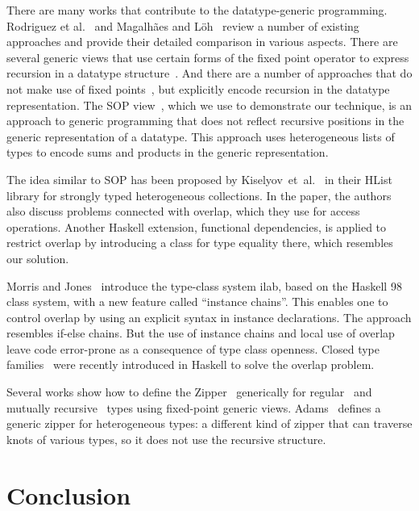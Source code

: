 \documentclass[sigplan,screen,review,anonymous]{acmart}
\begin{document}
There are many works that contribute to the datatype-generic programming. Rodriguez et al.~\cite{Rodriguez2008} and Magalh{\~{a}}es and L{\"{o}}h~\cite{MagLoeh2012} review a number of existing approaches and provide their detailed comparison in various aspects. There are several generic views that use certain forms of the fixed point operator to express recursion in a datatype structure~\cite{VanNoort2008,MuRec2009,Jansson1997,Loeh2011}. And there are a number of approaches that do not make use of fixed points~\cite{Chakravarty2009,Magalhaes2010}, but explicitly encode recursion in the datatype representation. The SOP view~\cite{VriLoeh2014}, which we use to demonstrate our technique, is an approach to generic programming that does not reflect recursive positions in the generic representation of a datatype. This approach uses heterogeneous lists of types to encode sums and products in the generic representation.

The idea similar to SOP has been proposed by Kiselyov~et~al.~\cite{Kiselyov2004} in their \textsf{HList} library for strongly typed heterogeneous collections. In the paper, the authors also discuss problems connected with overlap, which they use for access operations. Another Haskell extension, functional dependencies, is applied to restrict overlap by introducing a class for type equality there, which resembles our solution.

Morris and Jones~\cite{Morris2010} introduce the type-class system \textsf{ilab}, based on the Haskell 98 class system, with a new feature called ``instance chains''. This enables one to control overlap by using an explicit syntax in instance declarations. The approach resembles if-else chains. But the use of instance chains and local use of overlap leave code error-prone as a consequence of type class openness. Closed type families~\cite{Eisenberg2014} were recently introduced in Haskell to solve the overlap problem.

Several works show how to define the Zipper~\cite{Huet1997} generically for regular~\cite{HiJeLo2004,McBride2001} and mutually recursive~\cite{MuRec2009} types using fixed-point generic views. Adams~\cite{Adams2010} defines a generic zipper for heterogeneous types: a different kind of zipper that can traverse knots of various types, so it does not use the recursive structure.


\section{Conclusion}
\label{sec:conclusion}
\end{document}
